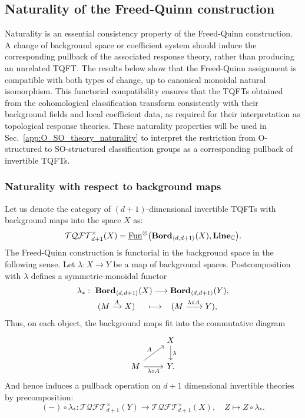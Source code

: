 \documentclass[aps,prx,reprint,superscriptaddress,twocolumn,amsmath,amssymb,amsfonts, nofootinbib]{revtex4-2}
\newcommand{\bordd}{{\bf Bord}_{\langle d, d+1\rangle}}
\newcommand{\Line}{{\bf Line}_{\mathbb{C}}}
\newcommand{\tqftd}{\mathcal{TQFT}_{d+1}}
\theoremstyle{apsstyle}
\begin{document}
\subsection{Naturality of the Freed-Quinn construction}
\label{sec:FQ_naturality}

Naturality is an essential consistency property of the
Freed-Quinn construction. A change of background space or coefficient
system should induce the corresponding pullback of the associated
response theory, rather than producing an unrelated TQFT. The results
below show that the Freed-Quinn assignment is compatible with both
types of change, up to canonical monoidal natural isomorphism. This functorial compatibility ensures that the TQFTs obtained from the
cohomological classification transform consistently with their
background fields and local coefficient data, as required for their
interpretation as topological response theories. These naturality
properties will be used in
Sec.~\ref{app:O_SO_theory_naturality} to interpret the restriction
from $\mathrm O$-structured to $\mathrm{SO}$-structured
classification groups as a corresponding pullback of invertible
TQFTs.


\subsubsection{Naturality with respect to background maps}
\label{app:naturality_bg_freedquinn}

Let us denote the category of $(d+1)$-dimensional invertible TQFTs with background maps into the space $X$ as:
\begin{equation*}
    \tqftd^{\times}(X)=\underline{\mathrm{Fun}}^{\otimes}\bigl(\bordd(X),\Line\bigr).
\end{equation*}
The Freed-Quinn construction is functorial in the background space in the following sense. Let $\lambda:X\to Y$ be a map of background spaces. Postcomposition with $\lambda$ defines a symmetric-monoidal functor
\begin{gather*}
\lambda_{*}:\ \bordd(X)\longrightarrow \bordd(Y),\\
\;\;\;\;(M\xrightarrow{A}X)\;\;\;\;\;\longmapsto \;\;\;(M\xrightarrow{\lambda\circ A}Y),
\end{gather*}
Thus, on each object, the background maps fit into the commutative diagram
\begin{equation*}
\begin{tikzcd}
& X \arrow[d,"\lambda"] \\
M \arrow[ur,"A"] \arrow[r,"\lambda\circ A"'] & Y.
\end{tikzcd}
\end{equation*}
And hence induces a pullback operation on $d{+}1$ dimensional invertible theories by precomposition:
\begin{equation*}
(-)\circ \lambda_{*}: \tqftd^{\times}(Y)
\rightarrow \tqftd^{\times}(X),
\quad
Z\longmapsto Z\circ \lambda_{*}.
\end{equation*}
\end{document}
